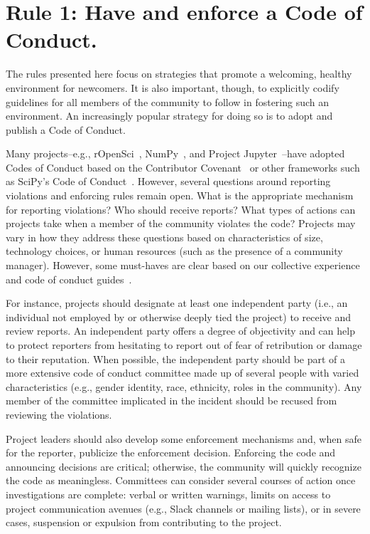 \documentclass[10pt,letterpaper]{article}
\newcommand{\rulemajor}[1]{\section{#1}}
\begin{document}
\rulemajor{Rule 1: Have and enforce a Code of Conduct.}

The rules presented here focus on strategies that promote a welcoming, healthy environment for newcomers.
It is also important, though, to explicitly codify guidelines for all members of the community to follow
in fostering such an environment.
An increasingly popular strategy for doing so is to adopt and publish a Code of Conduct.

Many projects--e.g., rOpenSci~\cite{ropensci-coc}, NumPy~\cite{numpy-coc}, and Project Jupyter~\cite{jupyter-coc}--have adopted Codes of Conduct
based on the Contributor Covenant~\cite{covenant}
or other frameworks such as SciPy's Code of Conduct~\cite{scipy-coc}.
However, several questions around reporting violations and enforcing rules remain open.
What is the appropriate mechanism for reporting violations?
Who should receive reports?
What types of actions can projects take when a member of the community violates the code?
Projects may vary in how they address these questions based on characteristics of size, technology choices, or human resources
(such as the presence of a community manager).
However, some must-haves are clear based on our collective experience and code of conduct guides~\cite{aurora2019}.

For instance,
projects should designate at least one independent party
(i.e., an individual not employed by or otherwise deeply tied the project)
to receive and review reports.
An independent party offers a degree of objectivity
and can help to protect reporters from hesitating to report out of fear of retribution or damage to their reputation.
When possible,
the independent party should be part of a more extensive code of conduct committee made up of several people with varied characteristics
(e.g., gender identity, race, ethnicity, roles in the community).
Any member of the committee implicated in the incident should be recused from reviewing the violations.

Project leaders should also develop some enforcement mechanisms and,
when safe for the reporter,
publicize the enforcement decision.
Enforcing the code and announcing decisions are critical;
otherwise,
the community will quickly recognize the code as meaningless.
Committees can consider several courses of action once investigations are complete:
verbal or written warnings,
limits on access to project communication avenues (e.g., Slack channels or mailing lists),
or in severe cases,
suspension or expulsion from contributing to the project.
\end{document}

